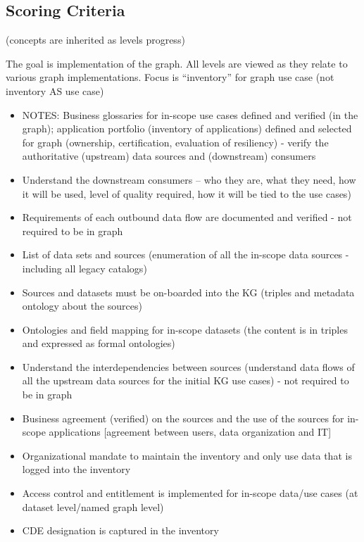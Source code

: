 \subsection*{Scoring Criteria}

(concepts are inherited as levels progress)

The goal is implementation of the graph.
All levels are viewed as they relate to various graph implementations.
Focus is “inventory” for graph use case (not inventory AS use case)

\kgmmscoringlevelOne

\begin{itemize}
  \item NOTES: Business glossaries for in-scope use cases defined and verified (in the graph); application portfolio (inventory of applications) defined and selected for graph (ownership, certification, evaluation of resiliency) - verify the authoritative (upstream) data sources and (downstream) consumers
  \item Understand the downstream consumers – who they are, what they need, how it will be used, level of quality required, how it will be tied to the use cases)
  \item Requirements of each outbound data flow are documented and verified - not required to be in graph
  \item List of data sets and sources (enumeration of all the in-scope data sources - including all legacy catalogs)
  \item Sources and datasets must be on-boarded into the KG (triples and metadata ontology about the sources)
  \item Ontologies and field mapping for in-scope datasets (the content is in triples and expressed as formal ontologies)
  \item Understand the interdependencies between sources (understand data flows of all the upstream data sources for the initial KG use cases) - not required to be in graph
  \item Business agreement (verified) on the sources and the use of the sources for in-scope applications [agreement between users, data organization and IT]
  \item Organizational mandate to maintain the inventory and only use data that is logged into the inventory
  \item Access control and entitlement is implemented for in-scope data/use cases (at dataset level/named graph level)
  \item CDE designation is captured in the inventory
\end{itemize}

